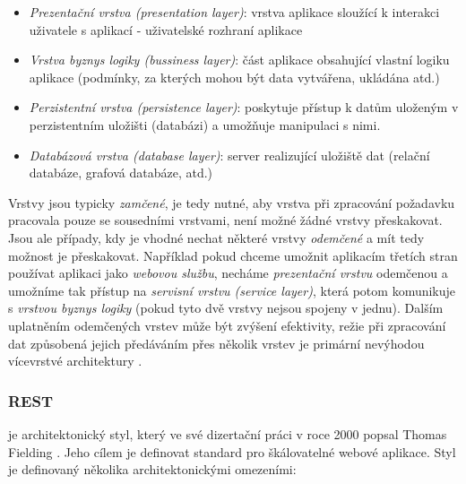 \begin{itemize}
  \item{\textit{Prezentační vrstva (presentation layer)}}: vrstva aplikace sloužící k interakci uživatele s aplikací - uživatelské rozhraní aplikace
  \item{\textit{Vrstva byznys logiky (bussiness layer)}}: část aplikace obsahující vlastní logiku aplikace (podmínky, za kterých mohou být data vytvářena, ukládána atd.)
  \item{\textit{Perzistentní vrstva (persistence layer)}}: poskytuje přístup k datům uloženým v perzistentním uložišti (databázi) a umožňuje manipulaci s nimi.
  \item{\textit{Databázová vrstva (database layer)}}: server realizující uložiště dat (relační databáze, grafová databáze, atd.)
\end{itemize}

Vrstvy jsou typicky \textit{zamčené}, je tedy nutné, aby vrstva při zpracování požadavku pracovala pouze se sousedními vrstvami, není možné žádné vrstvy přeskakovat. Jsou ale případy, kdy je vhodné nechat některé vrstvy \textit{odemčené} a mít tedy možnost je přeskakovat. Například pokud chceme umožnit aplikacím třetích stran používat aplikaci jako \textit{webovou službu}, necháme \textit{prezentační vrstvu} odemčenou a umožníme tak přístup na \textit{servisní vrstvu (service layer)}, která potom komunikuje s \textit{vrstvou byznys logiky} (pokud tyto dvě vrstvy nejsou spojeny v jednu). Dalším uplatněním odemčených vrstev může být zvýšení efektivity, režie při zpracování dat způsobená  jejich předáváním přes několik vrstev je primární nevýhodou vícevrstvé architektury \cite{Clark90}.

\subsubsection{REST}
\label{sec:rest}
\textit{} je architektonický styl, který ve své dizertační práci v roce 2000 popsal Thomas Fielding \cite{Fielding00}. Jeho cílem je definovat standard pro škálovatelné webové aplikace. Styl je definovaný několika architektonickými omezeními:

